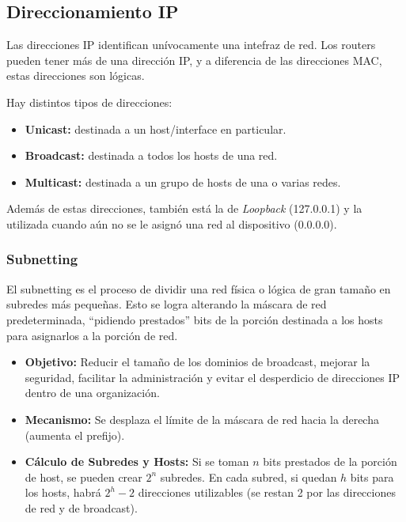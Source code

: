 \subsection{Direccionamiento IP}

Las direcciones IP identifican unívocamente una intefraz de red. Los routers pueden tener más de una dirección IP, y a diferencia de las direcciones MAC, estas direcciones son lógicas.

Hay distintos tipos de direcciones: 

\begin{itemize}[label=\textcolor{acento}{$\bullet$}]
    \item \textbf{Unicast:} destinada a un host/interface en particular.
    \item \textbf{Broadcast:} destinada a todos los hosts de una red.
    \item \textbf{Multicast:} destinada a un grupo de hosts de una o varias redes.
\end{itemize}

Además de estas direcciones, también está la de \emph{Loopback} (127.0.0.1) y la utilizada cuando aún no se le asignó una red al dispositivo (0.0.0.0).

\subsubsection{Subnetting}

El subnetting es el proceso de dividir una red física o lógica de gran tamaño en subredes más pequeñas. Esto se logra alterando la máscara de red predeterminada, ``pidiendo prestados'' bits de la porción destinada a los hosts para asignarlos a la porción de red.


\begin{itemize}[label=\textcolor{acento}{$\bullet$}]
    \item \textbf{Objetivo:} Reducir el tamaño de los dominios de broadcast, mejorar la seguridad, facilitar la administración y evitar el desperdicio de direcciones IP dentro de una organización.
    \item \textbf{Mecanismo:} Se desplaza el límite de la máscara de red hacia la derecha (aumenta el prefijo).
    \item \textbf{Cálculo de Subredes y Hosts:} 
    Si se toman $n$ bits prestados de la porción de host, se pueden crear $2^n$ subredes. En cada subred, si quedan $h$ bits para los hosts, habrá $2^h - 2$ direcciones utilizables (se restan 2 por las direcciones de red y de broadcast).
\end{itemize}

